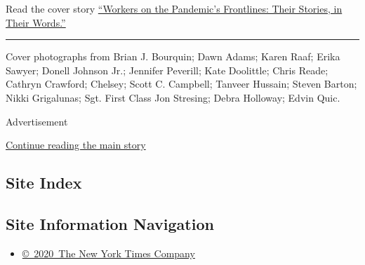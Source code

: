 Read the cover story
\href{https://www.nytimes3xbfgragh.onion/interactive/2020/04/01/magazine/coronavirus-workers.html\#}{``Workers
on the Pandemic's Frontlines: Their Stories, in Their Words.''}

\begin{center}\rule{0.5\linewidth}{\linethickness}\end{center}

Cover photographs from Brian J. Bourquin; Dawn Adams; Karen Raaf; Erika
Sawyer; Donell Johnson Jr.; Jennifer Peverill; Kate Doolittle; Chris
Reade; Cathryn Crawford; Chelsey; Scott C. Campbell; Tanveer Hussain;
Steven Barton; Nikki Grigalunas; Sgt. First Class Jon Stresing; Debra
Holloway; Edvin Quic.

Advertisement

\protect\hyperlink{after-bottom}{Continue reading the main story}

\hypertarget{site-index}{%
\subsection{Site Index}\label{site-index}}

\hypertarget{site-information-navigation}{%
\subsection{Site Information
Navigation}\label{site-information-navigation}}

\begin{itemize}
\tightlist
\item
  \href{https://help.nytimes3xbfgragh.onion/hc/en-us/articles/115014792127-Copyright-notice}{©~2020~The
  New York Times Company}
\end{itemize}

